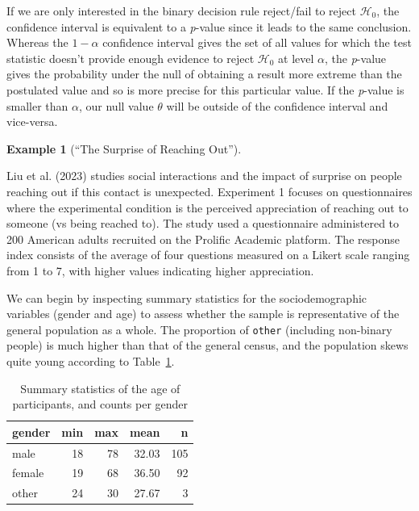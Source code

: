 \documentclass[
  11pt,
  letterpaper,
]{scrbook}
\theoremstyle{definition}
\newtheorem{example}{Example}[chapter]
\theoremstyle{remark}
\begin{document}
If we are only interested in the binary decision rule reject/fail to
reject \(\mathscr{H}_0\), the confidence interval is equivalent to a
\emph{p}-value since it leads to the same conclusion. Whereas the
\(1-\alpha\) confidence interval gives the set of all values for which
the test statistic doesn't provide enough evidence to reject
\(\mathscr{H}_0\) at level \(\alpha\), the \emph{p}-value gives the
probability under the null of obtaining a result more extreme than the
postulated value and so is more precise for this particular value. If
the \emph{p}-value is smaller than \(\alpha\), our null value \(\theta\)
will be outside of the confidence interval and vice-versa.

\begin{example}[``The Surprise of Reaching
Out'']\protect\hypertarget{exm-LiuRimMinMin2023E1}{}\label{exm-LiuRimMinMin2023E1}

Liu et al. (2023) studies social interactions and the impact of surprise
on people reaching out if this contact is unexpected. Experiment 1
focuses on questionnaires where the experimental condition is the
perceived appreciation of reaching out to someone (vs being reached to).
The study used a questionnaire administered to 200 American adults
recruited on the Prolific Academic platform. The response index consists
of the average of four questions measured on a Likert scale ranging from
1 to 7, with higher values indicating higher appreciation.

\end{example}

We can begin by inspecting summary statistics for the sociodemographic
variables (gender and age) to assess whether the sample is
representative of the general population as a whole. The proportion of
\texttt{other} (including non-binary people) is much higher than that of
the general census, and the population skews quite young according to
Table~\ref{tbl-LRMMS1-summarystat-a}.

\hypertarget{tbl-LRMMS1-summarystat-a}{}
\begin{table}
\caption{\label{tbl-LRMMS1-summarystat-a}Summary statistics of the age of participants, and counts per gender }\tabularnewline

\centering
\begin{tabular}{lrrrr}
\toprule
gender & min & max & mean & n\\
\midrule
male & 18 & 78 & 32.03 & 105\\
female & 19 & 68 & 36.50 & 92\\
other & 24 & 30 & 27.67 & 3\\
\bottomrule
\end{tabular}
\end{table}
\end{document}
